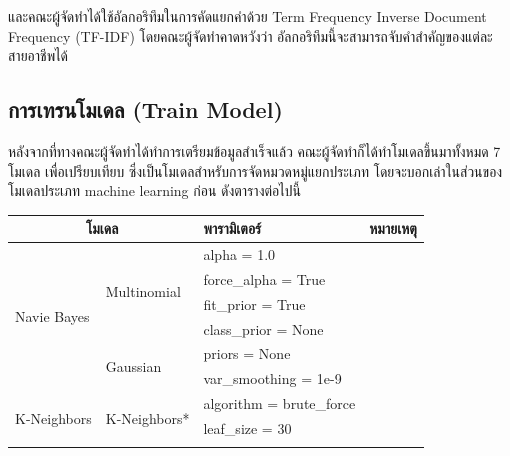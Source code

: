 และคณะผู้จัดทำได้ใช้อัลกอริทึมในการคัดแยกคำด้วย Term Frequency Inverse Document Frequency (TF-IDF) โดยคณะผู้จัดทำคาดหวังว่า
อัลกอริทึมนี้จะสามารถจับคำสำคัญของแต่ละสายอาชีพได้

\subsection{การเทรนโมเดล (Train Model)}
หลังจากที่ทางคณะผู้จัดทำได้ทำการเตรียมข้อมูลสำเร็จแล้ว คณะผู้จัดทำก็ได้ทำโมเดลขึ้นมาทั้งหมด 7 โมเดล เพื่อเปรียบเทียบ
ซึ่งเป็นโมเดลสำหรับการจัดหมวดหมู่แยกประเภท โดยจะบอกเล่าในส่วนของโมเดลประเภท machine learning ก่อน ดังตารางต่อไปนี้
\begin{table}[H]
    \begin{tabularx}{\textwidth}{|l|l|X|X|} \hline
        \multicolumn{2}{|c|}{โมเดล}                                   & พารามิเตอร์                       & หมายเหตุ                                                       \\ \hline
        \multirow{6}{*}{Navie Bayes}                                 & \multirow{4}{*}{Multinomial}    & alpha = 1.0              &                                    \\ \cline{3-4}
                                                                     &                                 & force\_alpha = True      &                                    \\ \cline{3-4}
                                                                     &                                 & fit\_prior = True        &                                    \\ \cline{3-4}
                                                                     &                                 & class\_prior = None      &                                    \\ \cline{2-4}
                                                                     & \multirow{2}{*}{Gaussian}       & priors = None            &                                    \\ \cline{3-4}
                                                                     &                                 & var\_smoothing = 1e-9    &                                    \\ \hline
        \multirow{7}{*}{K-Neighbors}                                 & \multirow{6}{*}{K-Neighbors*}   & algorithm = brute\_force &                                    \\ \cline{3-4}
                                                                     &                                 & leaf\_size = 30          &                                    \\ \cline{3-4}

\end{tabularx}
\end{table}
